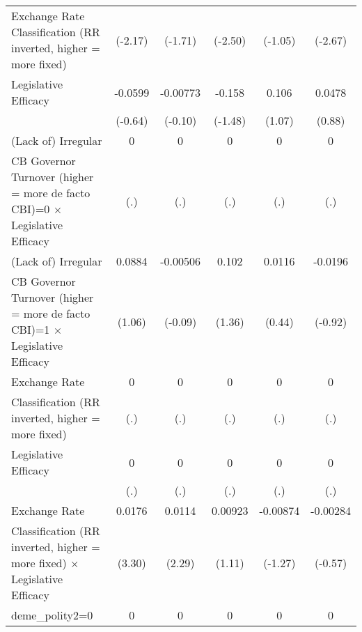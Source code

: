 {\begin{tabular}{l*{5}{c}}
Exchange Rate Classification (RR inverted, higher = more fixed)&     (-2.17)         &     (-1.71)         &     (-2.50)         &     (-1.05)         &     (-2.67)         \\
[1em]
Legislative Efficacy&     -0.0599         &    -0.00773         &      -0.158         &       0.106         &      0.0478         \\
                    &     (-0.64)         &     (-0.10)         &     (-1.48)         &      (1.07)         &      (0.88)         \\
[1em]
(Lack of) Irregular &           0         &           0         &           0         &           0         &           0         \\
CB Governor Turnover (higher = more de facto CBI)=0 $\times$ Legislative Efficacy&         (.)         &         (.)         &         (.)         &         (.)         &         (.)         \\
[1em]
(Lack of) Irregular &      0.0884         &    -0.00506         &       0.102         &      0.0116         &     -0.0196         \\
CB Governor Turnover (higher = more de facto CBI)=1 $\times$ Legislative Efficacy&      (1.06)         &     (-0.09)         &      (1.36)         &      (0.44)         &     (-0.92)         \\
[1em]
Exchange Rate       &           0         &           0         &           0         &           0         &           0         \\
Classification (RR inverted, higher = more fixed)&         (.)         &         (.)         &         (.)         &         (.)         &         (.)         \\
[1em]
Legislative Efficacy&           0         &           0         &           0         &           0         &           0         \\
                    &         (.)         &         (.)         &         (.)         &         (.)         &         (.)         \\
[1em]
Exchange Rate       &      0.0176\sym{**} &      0.0114\sym{*}  &     0.00923         &    -0.00874         &    -0.00284         \\
Classification (RR inverted, higher = more fixed) $\times$ Legislative Efficacy&      (3.30)         &      (2.29)         &      (1.11)         &     (-1.27)         &     (-0.57)         \\
[1em]
deme\_polity2=0      &           0         &           0         &           0         &           0         &           0         \\

\end{tabular}}
